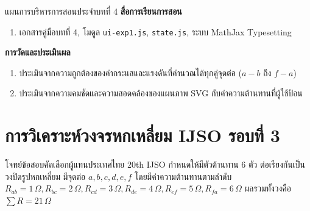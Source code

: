 \begin{teachingplan}{แผนการบริหารการสอนประจำบทที่ 4}
\noindent\textbf{สื่อการเรียนการสอน}
\begin{enumerate}[leftmargin=1.5em, itemsep=2pt]
    \item เอกสารคู่มือบทที่ 4, โมดูล \texttt{ui-exp1.js}, \texttt{state.js}, ระบบ MathJax Typesetting
\end{enumerate}

\noindent\textbf{การวัดและประเมินผล}
\begin{enumerate}[leftmargin=1.5em, itemsep=2pt]
    \item ประเมินจากความถูกต้องของค่ากระแสและแรงดันที่คำนวณได้ทุกคู่จุดต่อ ($a-b$ ถึง $f-a$)
    \item ประเมินจากความคมชัดและความสอดคล้องของแผนภาพ SVG กับค่าความต้านทานที่ผู้ใช้ป้อน
\end{enumerate}
\end{teachingplan}

\newpage

\section{การวิเคราะห์วงจรหกเหลี่ยม IJSO รอบที่ 3}
โจทย์ข้อสอบคัดเลือกผู้แทนประเทศไทย 20th IJSO กำหนดให้มีตัวต้านทาน 6 ตัว ต่อเรียงกันเป็นวงปิดรูปหกเหลี่ยม มีจุดต่อ $a, b, c, d, e, f$ โดยมีค่าความต้านทานตามลำดับ $R_{ab}=1\,\Omega, R_{bc}=2\,\Omega, R_{cd}=3\,\Omega, R_{de}=4\,\Omega, R_{ef}=5\,\Omega, R_{fa}=6\,\Omega$ ผลรวมทั้งวงคือ $\sum R = 21\,\Omega$

